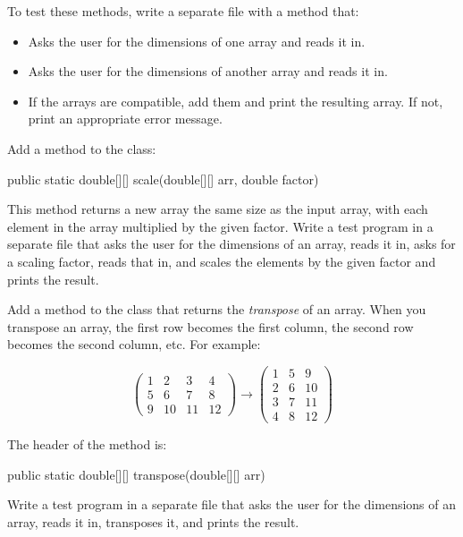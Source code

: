 \begin{exercise}
To test these methods, write a separate file with a  method that:

\begin{itemize}
\item Asks the user for the dimensions of one array and reads it in.
\item Asks the user for the dimensions of another array and reads it in.
\item If the arrays are compatible, add them and print the resulting array. If not, print an appropriate error message.
\end{itemize}

\end{exercise}

\begin{exercise}
Add a method to the  class:

\begin{code}
public static double[][] scale(double[][] arr, double factor)
\end{code}

This method returns a new array the same size as the input array, with each element in the array multiplied by the given factor. Write a test program in a separate file that asks the user for the dimensions of an array, reads it in, asks for a scaling factor, reads that in, and scales the elements by the given factor and prints the result.
\end{exercise}

\begin{exercise}
Add a method to the  class that returns the {\em transpose} of an array. When you transpose an array, the first row becomes the first column, the second row becomes the second column, etc. For example:

\begin{equation*}
\begin{pmatrix}
1 & 2 & 3 & 4 \\
5 & 6 & 7 & 8 \\
9 & 10 & 11 & 12
\end{pmatrix}
\rightarrow
\begin{pmatrix}
1 & 5 & 9 \\
2 & 6 & 10 \\
3 & 7 & 11 \\
4 & 8 & 12
\end{pmatrix}
\end{equation*}

The header of the method is:

\begin{code}
public static double[][] transpose(double[][] arr)
\end{code}


Write a test program in a separate file that asks the user for the dimensions of an array, reads it in, transposes it, and prints the result.

\end{exercise}

